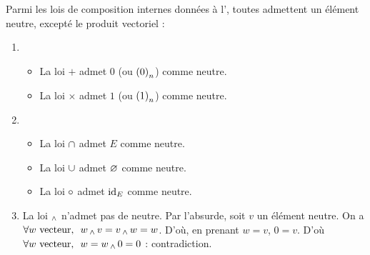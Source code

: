 \begin{ex}
Parmi les lois de composition internes données à l', toutes admettent un élément neutre, excepté le produit vectoriel :

\begin{enumerate}
\item \begin{itemize}
\item La loi \(+\) admet \(0\) (ou \(\left(0\right)_n\)) comme neutre. \\

\item La loi \(\times\) admet \(1\) (ou \(\left(1\right)_n\)) comme neutre. \\
\end{itemize}

\item \begin{itemize}
\item La loi \(\cap\) admet \(E\) comme neutre. \\

\item La loi \(\cup\) admet \(\varnothing\) comme neutre. \\

\item La loi \(\circ\) admet \(\mathrm{id}_{E}\) comme neutre. \\
\end{itemize}

\item La loi \(\operatorname{_\wedge}\) n'admet pas de neutre. Par l'absurde, soit \(v\) un élément neutre. On a \(\quantifs{\forall w\text{ vecteur}}w\vecto v=v\vecto w=w\). D'où, en prenant \(w=v\), \(0=v\). D'où \(\quantifs{\forall w\text{ vecteur}}w=w\vecto0=0\) : contradiction. \\
\end{enumerate}
\end{ex}

